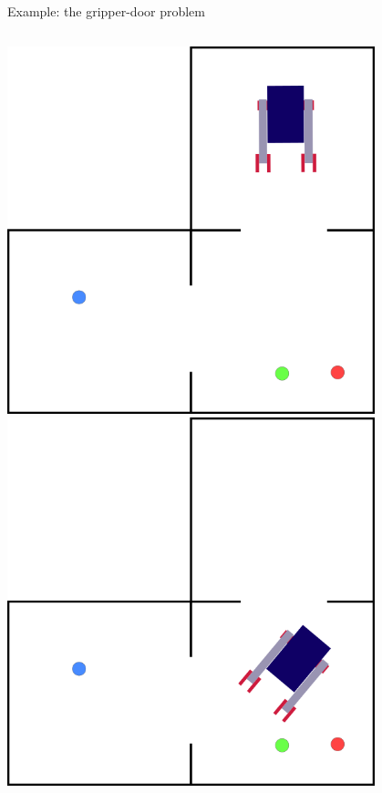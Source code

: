 \begin{frame}[fragile]{Example: the gripper-door problem}
    \begin{columns}[c]
        \begin{column}{0.3\textwidth}
            \centering
    
            \begin{overprint}
                \includegraphics[width = 0.8\textwidth]{images/3_rooms/gd_3_0.png}
                \includegraphics[width = 0.8\textwidth]{images/3_rooms/gd_3_1.png}

\end{overprint}
\end{column}
\end{columns}
\end{frame}
